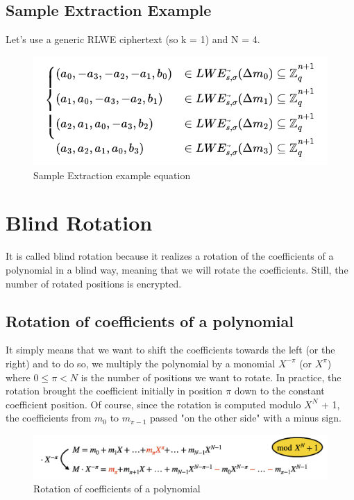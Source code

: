 \documentclass{techrep}
\theoremstyle{definition}
\theoremstyle{plain}
\begin{document}
\subsection{Sample Extraction Example}
Let's use a generic RLWE ciphertext (so k = 1) and N = 4. 

	\begin{figure}[H]
		\centering
	\includegraphics[width=0.7\columnwidth]{fig/sample_ext_exam.png}
		\caption{Sample Extraction example equation}
		\label{fig:sample_ext_exam}
	\end{figure}

\section{Blind Rotation}
It is called blind rotation because it realizes a rotation of the coefficients of a polynomial in a blind way, meaning that we will rotate the coefficients. Still, the number of rotated positions is encrypted.

\subsection{Rotation of coefficients of a polynomial}
It simply means that we want to shift the coefficients towards the left (or the right) and to do so, we multiply the polynomial by a monomial $X^{-\pi}$ (or $X^\pi$) where $0 \leq \pi < N$ is the number of positions we want to rotate.  In practice, the rotation brought the coefficient initially in position $\pi$ down to the constant coefficient position. Of course, since the rotation is computed modulo $X^N$ + 1, the coefficients from $m_0$ to $m_{\pi-1}$ passed "on the other side" with a minus sign.


	\begin{figure}[H]
		\centering
	\includegraphics[width=0.9\columnwidth]{fig/rotation.png}
		\caption{Rotation of coefficients of a polynomial}
		\label{fig:rotation}
	\end{figure}
\end{document}
